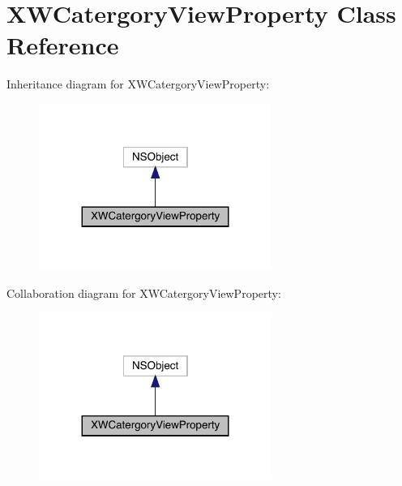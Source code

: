 \hypertarget{interface_x_w_catergory_view_property}{}\section{X\+W\+Catergory\+View\+Property Class Reference}
\label{interface_x_w_catergory_view_property}


Inheritance diagram for X\+W\+Catergory\+View\+Property\+:\nopagebreak
\begin{figure}[H]
\begin{center}
\leavevmode
\includegraphics[width=215pt]{interface_x_w_catergory_view_property__inherit__graph}
\end{center}
\end{figure}


Collaboration diagram for X\+W\+Catergory\+View\+Property\+:\nopagebreak
\begin{figure}[H]
\begin{center}
\leavevmode
\includegraphics[width=215pt]{interface_x_w_catergory_view_property__coll__graph}
\end{center}
\end{figure}
